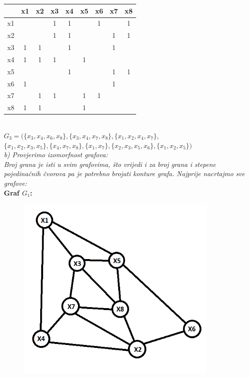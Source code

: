 \documentclass[12pt]{article}
\begin{document}
\begin{enumerate}
\begin{center}
      \begin{tabular}{|c|c|c|c|c|c|c|c|c|}
\hline
 & x1 & x2 & x3 & x4 & x5 & x6 & x7 & x8 \\ \hline
x1 &  &  & 1 & 1 &  & 1 &  & 1 \\ \hline
x2 &  &  & 1 & 1 &  &  & 1 & 1 \\ \hline
x3 & 1 & 1 &  & 1 &  &  & 1 &  \\ \hline
x4 & 1 & 1 & 1 &  & 1 &  &  &  \\ \hline
x5 &  &  &  & 1 &  &  & 1 & 1 \\ \hline
x6 & 1 &  &  &  &  &  & 1 &  \\ \hline
x7 &  & 1 & 1 &  & 1 & 1 &  &  \\ \hline
x8 & 1 & 1 &  &  & 1 &  &  &  \\ \hline
\end{tabular}\\
     \vspace{0.25cm}
     $G_3 = (\{x_3, x_4, x_6, x_8\}, \{x_3, x_4, x_7, x_8\}, \{x_1, x_2, x_4, x_7 \},$\\$\{x_1, x_2, x_3, x_5 \}, \{x_4, x_7, x_8\}, \{x_1, x_7\}, \{x_2, x_3, x_5, x_6 \}, \{x_1, x_2, x_5\})$\\
    \vspace{0.5cm}
    \textit{b) Provjerimo izomorfnost grafova:\\
    Broj grana je isti u svim grafovima, što vrijedi i za broj grana i stepene pojedinačnih čvorova pa je potrebno brojati konture grafa. Najprije nacrtajmo sve grafove:\\}
    \vspace{0.5cm}
    \textbf{Graf $G_1$: }
    
    \begin{figure}[htp]
    \centering
    \includegraphics[width=10cm]{GRAF1.png}
\end{figure}


\end{center}
\end{enumerate}
\end{document}

